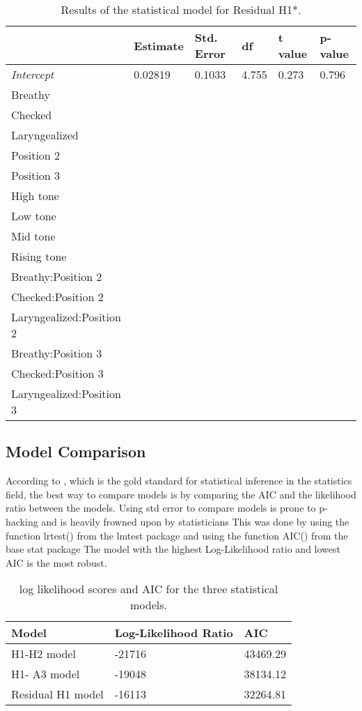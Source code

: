 \documentclass[12pt, letterpaper]{article}
\providecommand{\lsptoprule}{\midrule\toprule}
\providecommand{\lspbottomrule}{\bottomrule\midrule}
\begin{document}
\begin{table}[!h]
  \centering
  \caption{Results of the statistical model for Residual H1*.}
  \label{tab:H1H2Results}
  \begin{tabular}{llllll}
    \lsptoprule
     & Estimate & Std. Error & df & t value & p-value \\ \hline
    \textit{Intercept} & 0.02819 & 0.1033 & 4.755 & 0.273 & 0.796 \\
    Breathy &&&&& \\
    Checked &&&&& \\
    Laryngealized &&&&& \\
    Position 2 &&&&& \\
    Position 3 &&&&& \\
    High tone &&&&& \\
    Low tone &&&&& \\
    Mid tone &&&&& \\
    Rising tone &&&&& \\
    Breathy:Position 2 &&&&& \\
    Checked:Position 2 &&&&& \\
    Laryngealized:Position 2 &&&&& \\
    Breathy:Position 3 &&&&& \\
    Checked:Position 3 &&&&& \\
    Laryngealized:Position 3 &&&&& \\
    \lspbottomrule
  \end{tabular}
\end{table}

\subsection{Model Comparison} \label{sec:Comparison}


According to \citet{casellaStatisticalInference2002}, which is the gold standard for statistical inference in the statistics field, the best way to compare models is by comparing the AIC and the likelihood ratio between the models.
Using std error to compare models is prone to p-hacking and is heavily frowned upon by statisticians 
This was done by using the function lrtest() from the lmtest package and using the function AIC() from the base stat package
The model with the highest Log-Likelihood ratio and lowest AIC is the most robust. 

\begin{table}[!h]
  \centering
  \caption{log likelihood scores and AIC for the three statistical models.}
  \label{tab:Comparison}
  \begin{tabular}{lll}
    \lsptoprule
    Model & Log-Likelihood Ratio & AIC \\
    \hline
    H1-H2 model & -21716 & 43469.29 \\
    H1- A3 model & -19048 & 38134.12 \\
    Residual H1 model & -16113 & 32264.81 \\
    \lspbottomrule
  \end{tabular}
\end{table}
\end{document}
